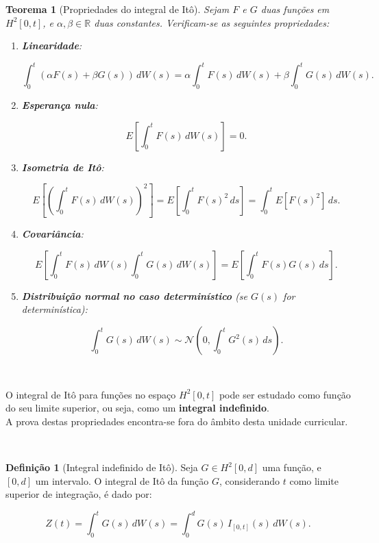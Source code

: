 \documentclass[
  11pt,
  a4paper,
]{book}
\newtheorem{theorem}{Teorema}[chapter]
\theoremstyle{definition}
\newtheorem{definition}{Definição}[chapter]
\theoremstyle{definition}
\theoremstyle{definition}
\theoremstyle{definition}
\theoremstyle{remark}
\begin{document}
\begin{theorem}[Propriedades do integral de Itô]

Sejam \(F\) e \(G\) duas funções em \(H^2[0,t]\), e \(\alpha, \beta \in \mathbb{R}\) duas constantes. Verificam-se as seguintes propriedades:

\begin{enumerate}
\def\labelenumi{\arabic{enumi}.}
\item
  \textbf{Linearidade}:

  \[
  \int_0^t \left( \alpha F(s) + \beta G(s) \right) \, dW(s) = 
  \alpha \int_0^t F(s) \, dW(s) + 
  \beta \int_0^t G(s) \, dW(s).
  \]
\item
  \textbf{Esperança nula}:

  \[
  E\left[\int_0^t F(s) \, dW(s)\right] = 0.
  \]
\item
  \textbf{Isometria de Itô}:

  \[
  E\left[\left(\int_0^t F(s) \, dW(s)\right)^2\right] = 
  E\left[\int_0^t F(s)^2 \, ds\right] = 
  \int_0^t E\left[F(s)^2\right] \, ds.
  \]
\item
  \textbf{Covariância}:

  \[
  E\left[\int_0^t F(s) \, dW(s) \int_0^t G(s) \, dW(s)\right] = 
  E\left[\int_0^t F(s) G(s) \, ds\right].
  \]
\item
  \textbf{Distribuição normal no caso determinístico} (se \(G(s)\) for determinística):

  \[
  \int_0^t G(s) \, dW(s) \sim \mathcal{N} \left( 0, \int_0^t G^2(s) \, ds \right).
  \]
\end{enumerate}

\end{theorem}

\(\,\)

O integral de Itô para funções no espaço \(H^2[0,t]\) pode ser estudado como função do seu limite superior, ou seja, como um \textbf{integral indefinido}.\\
A prova destas propriedades encontra-se fora do âmbito desta unidade curricular.

\(\,\)

\begin{definition}[Integral indefinido de Itô]
Seja \(G \in H^2[0,d]\) uma função, e \([0,d]\) um intervalo. O integral de Itô da função \(G\), considerando \(t\) como limite superior de integração, é dado por:

\[
Z(t) = \int_0^t G(s) \, dW(s) = \int_0^d G(s) \, I_{[0,t]}(s) \, dW(s).
\]
\end{definition}
\end{document}
